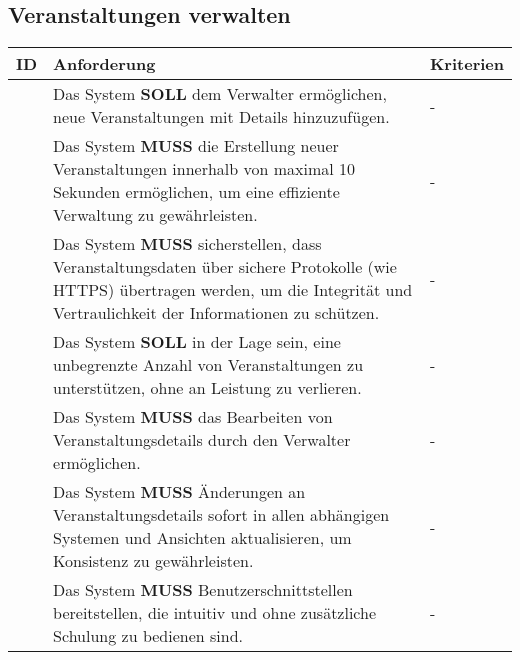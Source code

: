 \newpage

\subsection{Veranstaltungen verwalten}
\begin{tabular} {|p{}|p{}|p{}|}
	\hline
	ID & Anforderung & Kriterien \\
	\hline
	\printfreqnr
	& Das System \textbf{SOLL} dem Verwalter ermöglichen, neue Veranstaltungen mit Details hinzuzufügen. 
	& - \\
	\hline
	\printfreqnr
	& Das System \textbf{MUSS} die Erstellung neuer Veranstaltungen innerhalb von maximal 10 Sekunden ermöglichen, um eine effiziente Verwaltung zu gewährleisten. 
	& - \\
	\hline
	\printfreqnr
	& Das System \textbf{MUSS} sicherstellen, dass Veranstaltungsdaten über sichere Protokolle (wie HTTPS) übertragen werden, um die Integrität und Vertraulichkeit der Informationen zu schützen. 
	& - \\
	\hline
	\printfreqnr
	& Das System \textbf{SOLL} in der Lage sein, eine unbegrenzte Anzahl von Veranstaltungen zu unterstützen, ohne an Leistung zu verlieren. 
	& - \\
	\hline
	\printfreqnr
	& Das System \textbf{MUSS} das Bearbeiten von Veranstaltungsdetails durch den Verwalter ermöglichen. 
	& - \\
	\hline
	\printfreqnr
	& Das System \textbf{MUSS} Änderungen an Veranstaltungsdetails sofort in allen abhängigen Systemen und Ansichten aktualisieren, um Konsistenz zu gewährleisten. 
	& - \\
	\hline
	\printfreqnr
	& Das System \textbf{MUSS} Benutzerschnittstellen bereitstellen, die intuitiv und ohne zusätzliche Schulung zu bedienen sind. 
	& - \\
	\hline
\end{tabular}

\newpage

